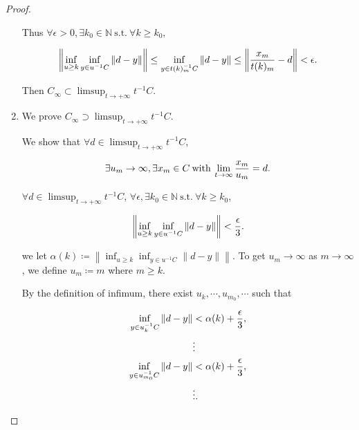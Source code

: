 \documentclass[a4paper,11pt]{jsarticle}
\newcommand{\NaturalNumberSet}{\mathbb{N}}
\newcommand{\SuchThat}{\:\text{s.t.}\:}
\begin{document}
\begin{proof}
\begin{enumerate}[label=i-\alph*,align=CenterWithParen]
      Thus $\forall \epsilon > 0, \exists k_0 \in \NaturalNumberSet \SuchThat \forall k \geq k_0,$

      \begin{equation}
        \left\lVert \inf_{u \geq k} \inf_{y \in u^{-1}C} \left\lVert d - y \right\rVert  \right\rVert \leq \inf_{y \in t(k)_{m}^{-1}C} \left\lVert d - y \right\rVert \leq \left\lVert \frac{x_m}{t(k)_{m}} - d \right\rVert < \epsilon. \notag
      \end{equation}

      Then $C_{\infty} \subset \limsup_{t \to + \infty} t^{-1}C$.

      \item We prove $C_{\infty} \supset \limsup_{t \to + \infty} t^{-1}C$.

      We show that $\forall d \in \limsup_{t \to + \infty} t^{-1}C$,

      \begin{equation}
        \exists u_m \to \infty, \exists x_m \in C \:\text{with}\: \lim_{t \to \infty} \frac{x_m}{u_m} = d. \notag
      \end{equation}

      $\forall d \in \limsup_{t \to + \infty} t^{-1}C$, $\forall \epsilon, \exists k_0 \in \NaturalNumberSet \SuchThat \forall k \geq k_0$,

      \begin{equation}
        \left\lVert \inf_{u \geq k} \inf_{y \in u^{-1}C} \left\lVert d - y  \right\rVert  \right\rVert < \frac{\epsilon}{3}. \notag
      \end{equation}

      we let $\alpha(k) \coloneqq \left\lVert \inf_{u \geq k} \inf_{y \in u^{-1}C} \left\lVert d - y  \right\rVert  \right\rVert$. To get $u_{m} \to \infty$ as $m \to \infty$, we define $u_m \coloneqq m$ where $m \geq k$.

      By the definition of infimum, there exist $u_k, \cdots, u_{m_0}, \cdots$ such that

      \begin{equation}
        \begin{split}
          \inf_{y \in u_k^{-1}C} \left\lVert d - y \right\rVert  &< \alpha(k) + \frac{\epsilon}{3}, \\
          &\vdots  \\
          \inf_{y \in u_{m_0}^{-1}C} \left\lVert d - y \right\rVert  &< \alpha(k) + \frac{\epsilon}{3}, \\
          &\vdots. \notag
        \end{split}
      \end{equation}


\end{enumerate}
\end{proof}
\end{document}
